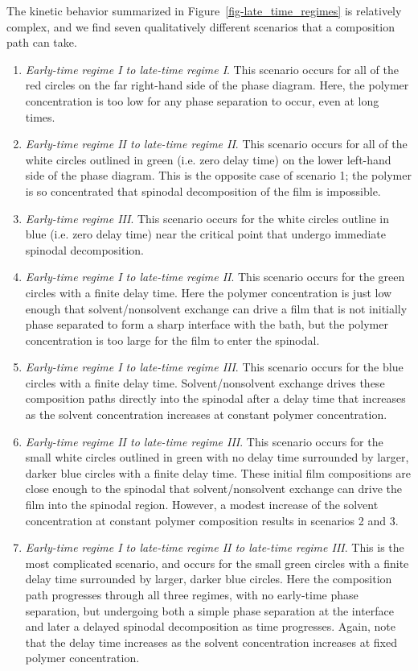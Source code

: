 \documentclass[journal=mamobx, layout=twocolumn]{achemso}
\begin{document}
The kinetic behavior summarized in Figure~\ref{fig-late_time_regimes} is relatively complex, and we find seven qualitatively different scenarios that a composition path can take.
\begin{enumerate}
\item \emph{Early-time regime I to late-time regime I}.
This scenario occurs for all of the red circles on the far right-hand side of the phase diagram.
Here, the polymer concentration is too low for any phase separation to occur, even at long times.

\item \emph{Early-time regime II to late-time regime II}.
This scenario occurs for all of the white circles outlined in green (i.e. zero delay time) on the lower left-hand side of the phase diagram.
This is the opposite case of scenario 1; the polymer is so concentrated that spinodal decomposition of the film is impossible.

\item \emph{Early-time regime III}.
This scenario occurs for the white circles outline in blue (i.e. zero delay time) near the critical point that undergo immediate spinodal decomposition.

\item \emph{Early-time regime I to late-time regime II}.
This scenario occurs for the green circles with a finite delay time.
Here the polymer concentration is just low enough that solvent/nonsolvent exchange can drive a film that is not initially phase separated to form a sharp interface with the bath, but the polymer concentration is too large for the film to enter the spinodal.

\item \emph{Early-time regime I to late-time regime III}.
This scenario occurs for the blue circles with a finite delay time.
Solvent/nonsolvent exchange drives these composition paths directly into the spinodal after a delay time that increases as the solvent concentration increases at constant polymer concentration.

\item \emph{Early-time regime II to late-time regime III}.
This scenario occurs for the small white circles outlined in green with no delay time surrounded by larger, darker blue circles with a finite delay time.
These initial film compositions are close enough to the spinodal that solvent/nonsolvent exchange can drive the film into the spinodal region.
However, a modest increase of the solvent concentration at constant polymer composition results in scenarios 2 and 3.

\item \emph{Early-time regime I to late-time regime II to late-time regime III}.
This is the most complicated scenario, and occurs for the small green circles with a finite delay time surrounded by larger, darker blue circles.
Here the composition path progresses through all three regimes, with no early-time phase separation, but undergoing both a simple phase separation at the interface and later a delayed spinodal decomposition as time progresses.
Again, note that the delay time increases as the solvent concentration increases at fixed polymer concentration.
\end{enumerate}
\end{document}
